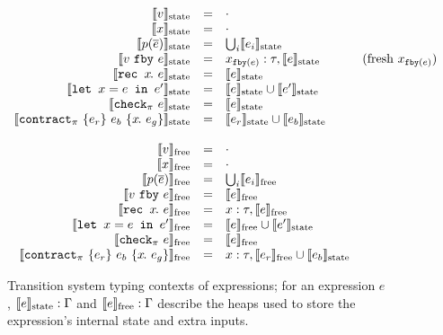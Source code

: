\documentclass[a4paper,UKenglish,cleveref, autoref, thm-restate,anonymous]{lipics-v2021}
\begin{document}
\begin{figure}
  \small
  \[
  \begin{array}{rrlr}
    \sysstate{v} & = & \cdot \\
    \sysstate{x} & = & \cdot \\
    \sysstate{p(\ov{e})} & = & \bigcup_i \sysstate{e_i} \\
    \sysstate{\xfby{v}{e}} & = & x_{\tt{fby}(e)}: \tau, \sysstate{e} & \text{(fresh $x_{\tt{fby}(e)}$)} \\
    \sysstate{\xrec{x}{e}} & = & \sysstate{e} \\
    \sysstate{\xlet{x}{e}{e'}} & = & \sysstate{e} \cup \sysstate{e'} \\
    \sysstate{\xcheckP{\PStatus}{e}} & = & \sysstate{e} \\
    \sysstate{\xctr} & = & \sysstate{e_r} \cup \sysstate{e_b} \\
    \\
    \sysoracle{v} & = & \cdot \\
    \sysoracle{x} & = & \cdot \\
    \sysoracle{p(\ov{e})} & = & \bigcup_i \sysoracle{e_i} \\
    \sysoracle{\xfby{v}{e}} & = & \sysoracle{e} \\
    \sysoracle{\xrec{x}{e}} & = & x: \tau, \sysoracle{e} \\
    \sysoracle{\xlet{x}{e}{e'}} & = & \sysoracle{e} \cup \sysstate{e'} \\
    \sysoracle{\xcheckP{\PStatus}{e}} & = & \sysoracle{e} \\
    \sysoracle{\xctr} & = & x: \tau, \sysoracle{e_r} \cup \sysstate{e_b} \\
  \end{array}
\]
\caption{Transition system typing contexts of expressions; for an expression $e$, $\sysstate{e} : \Gamma$ and $\sysoracle{e} : \Gamma$ describe the heaps used to store the expression's internal state and extra inputs.}
\label{f:system-translation-contexts}
\end{figure}
\end{document}
